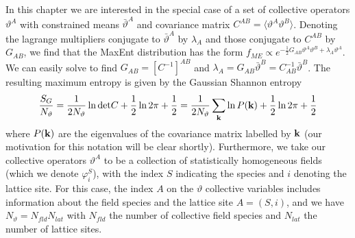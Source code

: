 \documentclass[11pt,a4paper]{article}
\begin{document}
In this chapter we are interested in the special case of a set of collective operators $\vartheta^A$ with constrained means $\bar{\vartheta}^A$ and covariance matrix $C^{AB} = \langle \vartheta^A\vartheta^B \rangle$.
Denoting the lagrange multipliers conjugate to $\bar{\vartheta}^A$ by $\lambda_A$ and those conjugate to $C^{AB}$ by $G_{AB}$, we find that the MaxEnt distribution has the form $f_{ME} \propto e^{-\frac{1}{2}G_{AB}\vartheta^A\vartheta^B + \lambda_A\vartheta^A}$.
We can easily solve to find $G_{AB} = [C^{-1}]^{AB}$ and $\lambda_A = G_{AB}\bar{\vartheta}^B = C^{-1}_{AB}\bar{\vartheta}^B$.
The resulting maximum entropy is given by the Gaussian Shannon entropy
\begin{equation}
  \frac{S_{G}}{N_{\vartheta}} = \frac{1}{2N_{\vartheta}}\ln\mathrm{det}C + \frac{1}{2}\ln 2\pi + \frac{1}{2} = \frac{1}{2N_{\vartheta}}\sum_{\bf k} \ln P({\bf k}) + \frac{1}{2}\ln 2\pi + \frac{1}{2}
\end{equation}
where $P({\bf k})$ are the eigenvalues of the covariance matrix labelled by ${\bf k}$ (our motivation for this notation will be clear shortly).
Furthermore, we take our collective operators $\vartheta^A$ to be a collection of statistically homogeneous fields (which we denote $\varphi^S_i$), with the index $S$ indicating the species and $i$ denoting the lattice site.
For this case, the index $A$ on the $\vartheta$ collective variables includes information about the field species and the lattice site $A=(S,i)$,
and we have $N_{\vartheta} = N_{fld}N_{lat}$ with $N_{fld}$ the number of collective field species and $N_{lat}$ the number of lattice sites.
\end{document}
